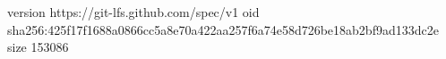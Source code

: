 version https://git-lfs.github.com/spec/v1
oid sha256:425f17f1688a0866cc5a8e70a422aa257f6a74e58d726be18ab2bf9ad133dc2e
size 153086
